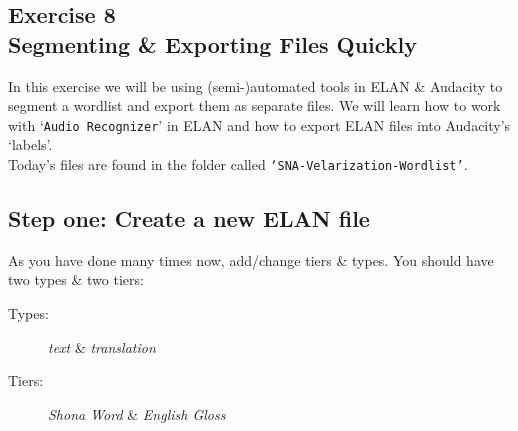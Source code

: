 \documentclass[letterpaper,12pt]{article}
\begin{document}
\begin{center}
\section*{{Exercise 8}\\Segmenting \& Exporting Files Quickly}
\end{center}

\noindent In this exercise we will be using (semi-)automated tools in ELAN \& Audacity to segment a wordlist and export them as separate files. We will learn how to work with `\texttt{Audio Recognizer}' in ELAN and how to export ELAN files into Audacity's `labels'.\\

\noindent Today's files are found in the folder called \texttt{`SNA-Velarization-Wordlist'}.\\

\subsection*{Step one: Create a new ELAN file}
As you have done many times now, add/change tiers \& types. You should have two types \& two tiers: 
\begin{description}
  \item[Types: ] \textit{text} \& \textit{translation} 
  \item[Tiers: ] \textit{Shona Word} \& \textit{English Gloss}
\end{description}
\end{document}
